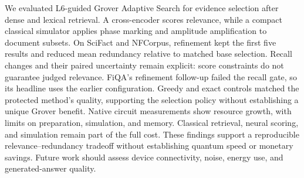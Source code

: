 We evaluated L6-guided Grover Adaptive Search for evidence selection after dense and lexical retrieval. A cross-encoder scores relevance, while a compact classical simulator applies phase marking and amplitude amplification to document subsets. On SciFact and NFCorpus, refinement kept the first five results and reduced mean redundancy relative to matched base selection. Recall changes and their paired uncertainty remain explicit: score constraints do not guarantee judged relevance. FiQA's refinement follow-up failed the recall gate, so its headline uses the earlier configuration. Greedy and exact controls matched the protected method's quality, supporting the selection policy without establishing a unique Grover benefit. Native circuit measurements show resource growth, with limits on preparation, simulation, and memory. Classical retrieval, neural scoring, and simulation remain part of the full cost. These findings support a reproducible relevance--redundancy tradeoff without establishing quantum speed or monetary savings. Future work should assess device connectivity, noise, energy use, and generated-answer quality.
